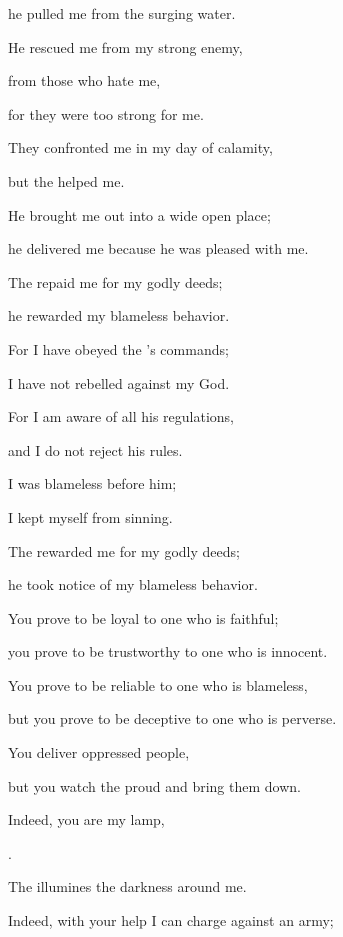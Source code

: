 {\par }{\Q he pulled
me from the surging
water.
\par }{\Q {}He rescued me from my strong
enemy,
\par }{\Q from those who hate
me,
\par }{\Q for
they were too
strong for me.
\par }{\Q {}They confronted
me in my day
of calamity,
\par }{\Q but the
{}
helped me.
\par }{\Q {}He brought
me out
into a wide open place;
\par }{\Q he delivered
me because
he was pleased with me.
\par }{\Q {}The
{}
repaid
me for my godly deeds;
\par }{\Q he rewarded
my blameless
behavior.
\par }{\Q {}For
I have obeyed
the
{}’s
commands;
\par }{\Q I have not
rebelled
against my God.
\par }{\Q {}For
I am aware
of all
his regulations,
\par }{\Q and I do not
reject
his rules.
\par }{\Q {}I was
blameless
before him;
\par }{\Q I kept
myself from sinning.
\par }{\Q {}The
{}
rewarded
me for my godly deeds;
\par }{\Q he took notice of my blameless
behavior.
\par }{\Q {}You
prove to be loyal
to one who is faithful;
\par }{\Q you prove to be trustworthy
to one
who is innocent.
\par }{\Q {}You prove
to be
reliable to
one who is blameless,
\par }{\Q but
you prove to be deceptive
to one who is perverse.
\par }{\Q {}You deliver
oppressed
people,
\par }{\Q but you watch
the proud and bring them down.
\par }{\Q {}Indeed,
you
are my lamp,

{}.
\par }{\Q The
{}
illumines
the darkness around me.
\par }{\Q {}Indeed, with
your help I can charge against an army;

}
